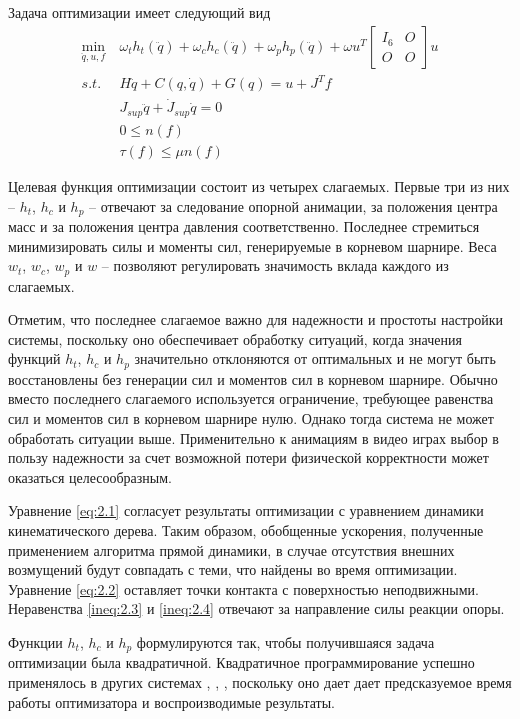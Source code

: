 Задача оптимизации имеет следующий вид
\begin{align*}
  \min_{\ddot{q}, u, f} &\ \omega_{t} h_{t}(\ddot{q}) + \omega_{c} h_{c}(\ddot{q}) + \omega_{p} h_{p}(\ddot{q}) + \omega u^{T} \begin{bmatrix} I_{6} & O \\ O & O \end{bmatrix} u \\
  s.t. &\ H \ddot{q} + C(q, \dot{q}) + G(q) = u + J^{T} f \tag{2.1}\label{eq:2.1} \\
       &\ J_{sup} \ddot{q} + \dot{J}_{sup} \dot{q} = 0 \tag{2.2}\label{eq:2.2} \\
       &\ 0 \le n(f) \tag{2.3}\label{ineq:2.3} \\
       &\ \tau(f) \le \mu n(f) \tag{2.4}\label{ineq:2.4}
\end{align*}

Целевая функция оптимизации состоит из четырех слагаемых. Первые три из них -- $h_{t}$, $h_{c}$ и $h_{p}$ -- отвечают за следование опорной анимации, за положения центра масс и за положения центра давления соответственно. Последнее стремиться минимизировать силы и моменты сил, генерируемые в корневом шарнире. Веса $w_{t}$, $w_{c}$, $w_{p}$ и $w$ -- позволяют регулировать значимость вклада каждого из слагаемых.

Отметим, что последнее слагаемое важно для надежности и простоты настройки системы, поскольку оно обеспечивает обработку ситуаций, когда значения функций $h_{t}$, $h_{c}$ и $h_{p}$ значительно отклоняются от оптимальных и не могут быть восстановлены без генерации сил и моментов сил в корневом шарнире. Обычно вместо последнего слагаемого используется ограничение, требующее равенства сил и моментов сил в корневом шарнире нулю. Однако тогда система не может обработать ситуации выше. Применительно к анимациям в видео играх выбор в пользу надежности за счет возможной потери физической корректности может оказаться целесообразным.

Уравнение \ref{eq:2.1} согласует результаты оптимизации с уравнением динамики кинематического дерева. Таким образом, обобщенные ускорения, полученные применением алгоритма прямой динамики, в случае отсутствия внешних возмущений будут совпадать с теми, что найдены во время оптимизации. Уравнение \ref{eq:2.2} оставляет точки контакта с поверхностью неподвижными. Неравенства \ref{ineq:2.3} и \ref{ineq:2.4} отвечают за направление силы реакции опоры.

Функции $h_{t}$, $h_{c}$ и $h_{p}$ формулируются так, чтобы получившаяся задача оптимизации была квадратичной. Квадратичное программирование успешно применялось в других системах \cite{AbeSP}, \cite{MacchiettoZS}, \cite{SilvaAP}, поскольку оно дает дает предсказуемое время работы оптимизатора и воспроизводимые результаты.

